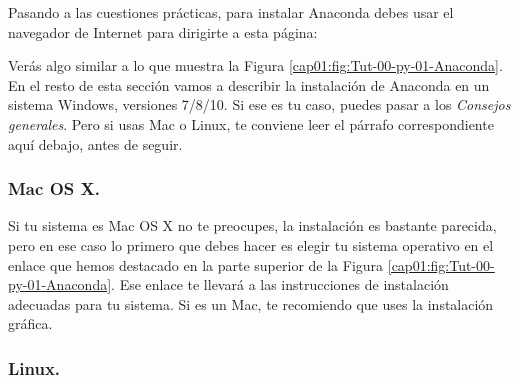 \documentclass[10pt,a4paper]{article}\usepackage[]{graphicx}\usepackage[]{color}
\newcounter {cont01}
\begin{document}
Pasando a las cuestiones prácticas, para instalar Anaconda debes usar el  navegador de Internet para dirigirte a esta página:
\begin{center}
\end{center}
Verás algo similar a lo que muestra la Figura \ref{cap01:fig:Tut-00-py-01-Anaconda}. En el resto de esta sección vamos a describir la instalación de Anaconda en un sistema Windows, versiones 7/8/10. Si ese es tu caso, puedes pasar a los {\em Consejos generales}. Pero si usas Mac o Linux, te conviene leer el párrafo correspondiente aquí debajo, antes de seguir.

\subsubsection*{Mac OS X.}

Si tu sistema es Mac OS X no te preocupes, la instalación es bastante parecida, pero en ese caso lo primero que debes hacer es elegir tu sistema operativo en el enlace que hemos destacado en la parte superior de la Figura \ref{cap01:fig:Tut-00-py-01-Anaconda}. Ese enlace te llevará a las instrucciones de instalación adecuadas para tu sistema. Si es un Mac, te recomiendo que uses la instalación gráfica. 

\subsubsection*{Linux.}
\end{document}
